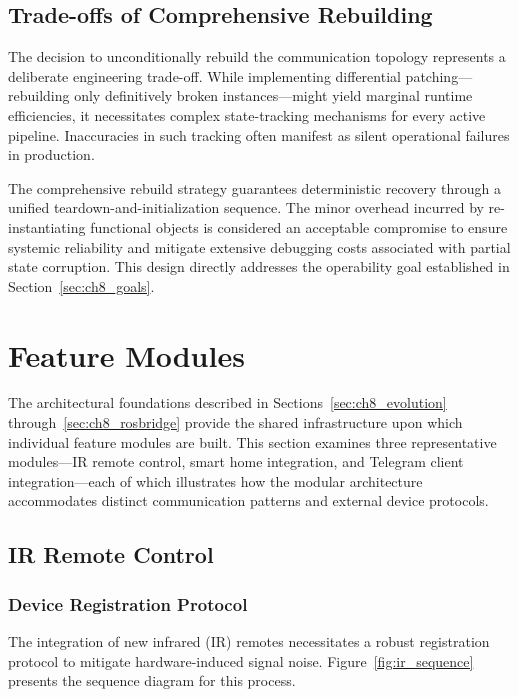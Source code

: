 \subsection{Trade-offs of Comprehensive Rebuilding}
\label{sec:ch8_rebuild_tradeoff}

The decision to unconditionally rebuild the communication topology represents a deliberate engineering trade-off. While implementing differential patching—rebuilding only definitively broken instances—might yield marginal runtime efficiencies, it necessitates complex state-tracking mechanisms for every active pipeline. Inaccuracies in such tracking often manifest as silent operational failures in production.

The comprehensive rebuild strategy guarantees deterministic recovery through a unified teardown-and-initialization sequence. The minor overhead incurred by re-instantiating functional objects is considered an acceptable compromise to ensure systemic reliability and mitigate extensive debugging costs associated with partial state corruption. This design directly addresses the operability goal established in Section~\ref{sec:ch8_goals}.

\section{Feature Modules}
\label{sec:ch8_features}

The architectural foundations described in Sections~\ref{sec:ch8_evolution} through~\ref{sec:ch8_rosbridge} provide the shared infrastructure upon which individual feature modules are built. This section examines three representative modules—IR remote control, smart home integration, and Telegram client integration—each of which illustrates how the modular architecture accommodates distinct communication patterns and external device protocols.

\subsection{IR Remote Control}
\label{sec:ch8_ir}

\subsubsection{Device Registration Protocol}
\label{sec:ch8_ir_registration}

The integration of new infrared (IR) remotes necessitates a robust registration protocol to mitigate hardware-induced signal noise. Figure~\ref{fig:ir_sequence} presents the sequence diagram for this process.

